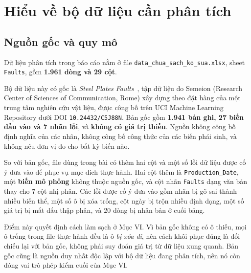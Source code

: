 \documentclass[12pt]{article}
\begin{document}
\clearpage
\section{Hiểu về bộ dữ liệu cần phân tích}

\subsection{Nguồn gốc và quy mô}

Dữ liệu phân tích trong báo cáo nằm ở file \texttt{data\_chua\_sach\_ko\_sua.xlsx}, sheet \texttt{Faults}, gồm \textbf{1.961 dòng và 29 cột}.

\noindent Bộ dữ liệu này có gốc là \emph{Steel Plates Faults}~\cite{steelplates2010}, tập dữ liệu do Semeion (Research Center of Sciences of Communication, Rome) xây dựng theo đặt hàng của một trung tâm nghiên cứu vật liệu, được công bố trên UCI Machine Learning Repository dưới DOI \texttt{10.24432/C5J88N}. Bản gốc gồm \textbf{1.941 bản ghi, 27 biến đầu vào và 7 nhãn lỗi}, và \textbf{không có giá trị thiếu}. Nguồn không công bố định nghĩa của các nhãn, không công bố công thức của các biến phái sinh, và không nêu đơn vị đo cho bất kỳ biến nào.

\noindent So với bản gốc, file dùng trong bài có thêm hai cột và một số lỗi dữ liệu được cố ý đưa vào để phục vụ mục đích thực hành. Hai cột thêm là \texttt{Production\_Date}, một \textbf{biến mô phỏng} không thuộc nguồn gốc, và cột nhãn \texttt{Faults} dạng văn bản thay cho 7 cột nhị phân. Các lỗi được cố ý đưa vào gồm nhãn bị gõ sai thành nhiều biến thể, một số ô bị xóa trống, cột ngày bị trộn nhiều định dạng, một số giá trị bị mất dấu thập phân, và 20 dòng bị nhân bản ở cuối bảng.

\noindent Điểm này quyết định cách làm sạch ở Mục VI. Vì bản gốc không có ô thiếu, mọi ô trống trong file thực hành đều là ô \emph{bị xóa đi}, nên cách khôi phục đúng là đối chiếu lại với bản gốc, không phải suy đoán giá trị từ dữ liệu xung quanh. Bản gốc cũng là nguồn duy nhất độc lập với bộ dữ liệu đang phân tích, nên nó còn đóng vai trò phép kiểm cuối của Mục VI.
\end{document}
